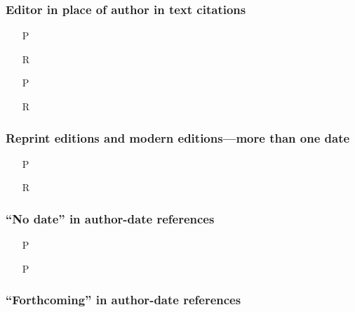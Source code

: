 \documentclass[11pt,letterpaper,oneside]{article}
\begin{document}
\subsubsection{Editor in place of author in text citations}

\begin{itemize}
\item[P] 

\item[R] 

\item[P] 

\item[R] 
\end{itemize}

\setcounter{subsubsection}{37}
\subsubsection{Reprint editions and modern editions---more than one
date}

\begin{itemize}
\item[P] 

\item[R] 
\end{itemize}

\setcounter{subsubsection}{40}
\subsubsection{``No date'' in author-date references}

\begin{itemize}
\item[P] 


\item[P] 

\end{itemize}

\subsubsection{``Forthcoming'' in author-date references}
\end{document}
